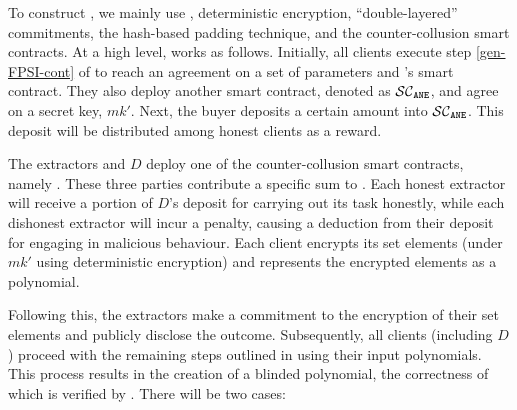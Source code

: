 



To construct  \epsi, we mainly use \fpsi, deterministic encryption, ``double-layered'' commitments, the hash-based padding technique, and the counter-collusion smart contracts. %
%
At a high level, \epsi works as follows. Initially, all clients execute step \ref{gen-FPSI-cont} of \fpsi to reach an agreement on a set of parameters and \fpsi's smart contract.  They also deploy another smart contract, denoted as $\mathcal{SC}_{\mathtt{ANE}}$, and agree on a secret key, $mk'$. 
%
Next, the buyer deposits a certain amount into $\mathcal{SC}_{\mathtt{ANE}}$. This deposit will be distributed among honest clients as a reward. 
%

The extractors and $D$ deploy one of the counter-collusion smart contracts, namely \SCpc. These three parties contribute a specific sum to \SCpc.  Each honest extractor will receive a portion of $D$'s deposit for carrying out its task honestly, while each dishonest extractor will incur a penalty, causing a deduction from their deposit for engaging in malicious behaviour. 
%
Each client encrypts its set elements (under $mk'$ using deterministic encryption) and represents the encrypted elements as a polynomial. %








%

Following this, the extractors make a commitment to the encryption of their set elements and publicly disclose the outcome. Subsequently, all clients (including $D$) proceed with the remaining steps outlined in \fpsi using their input polynomials. This process results in the creation of a blinded polynomial, the correctness of which is verified by \scf. There will be two cases: 

